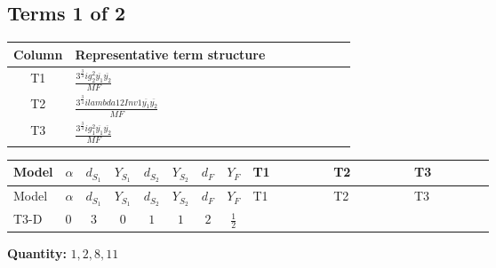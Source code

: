 \documentclass[8pt]{article}
\begin{document}
\begin{landscape}
\subsection*{Terms 1 of 2}
\begin{center}
\begin{tabular}{@{}c >{\raggedright\arraybackslash}p{0.82\linewidth}@{}}
\toprule
Column & Representative term structure \\
\midrule
T1 & \(\displaystyle \frac{3^{\frac{3}{4}} i g_{2}^{2} \overline{y_{1}} \overline{y_{2}}}{MF}\) \\
\midrule
T2 & \(\displaystyle \frac{3^{\frac{3}{4}} i lambda12Inv1 \overline{y_{1}} \overline{y_{2}}}{MF}\) \\
\midrule
T3 & \(\displaystyle \frac{3^{\frac{3}{4}} i g_{1}^{2} \overline{y_{1}} \overline{y_{2}}}{MF}\) \\
\midrule
\bottomrule
\end{tabular}
\end{center}
\smallskip
\tiny
\begin{longtable}{@{}llcccccc >{\raggedright\arraybackslash}p{0.21\linewidth} >{\raggedright\arraybackslash}p{0.21\linewidth} >{\raggedright\arraybackslash}p{0.21\linewidth}@{}}
\toprule
Model & $\alpha$ & $d_{S_1}$ & $Y_{S_1}$ & $d_{S_2}$ & $Y_{S_2}$ & $d_F$ & $Y_F$ & T1 & T2 & T3 \\
\midrule
\endfirsthead
\toprule
Model & $\alpha$ & $d_{S_1}$ & $Y_{S_1}$ & $d_{S_2}$ & $Y_{S_2}$ & $d_F$ & $Y_F$ & T1 & T2 & T3 \\
\midrule
\endhead
T3-D & $0$ & $3$ & $0$ & $1$ & $1$ & $2$ & $\frac{1}{2}$ & \scriptsize\adjustbox{max width=\linewidth}{$\begin{gathered} - \frac{25 \cdot 3^{\frac{3}{4}} i g_{2}^{2} \overline{y_{1}} \overline{y_{2}}}{24 MF}\end{gathered}$} & \scriptsize\adjustbox{max width=\linewidth}{$\begin{gathered} - \frac{3^{\frac{3}{4}} i lambda12Inv1 \overline{y_{1}} \overline{y_{2}}}{6 MF}\end{gathered}$} & \scriptsize\adjustbox{max width=\linewidth}{$\begin{gathered} - \frac{3^{\frac{3}{4}} i g_{1}^{2} \overline{y_{1}} \overline{y_{2}}}{8 MF}\end{gathered}$} \\
\midrule
\bottomrule
\end{longtable}
\clearpage
\noindent\textbf{Quantity: }$\mathrm{1,2,8,11}$\par\smallskip

\end{landscape}
\end{document}
